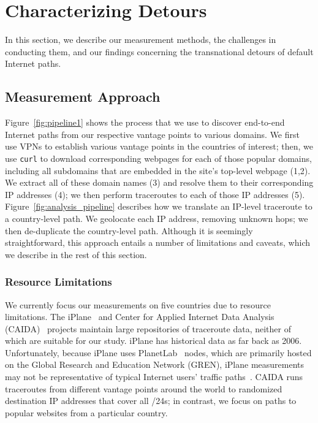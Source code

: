 \section{Characterizing Detours}
\label{datasets}
In this section, we describe our measurement methods, the challenges in
conducting them, and our findings concerning the transnational detours
of default Internet paths.

\subsection{Measurement Approach}
\label{pipeline}

Figure~\ref{fig:pipeline1} shows the process that we use to discover end-to-end
Internet paths from our respective vantage points to various domains. We first use
VPNs
to establish various vantage points in the countries of interest; then, we use 
{\tt curl} to download corresponding webpages for each of those popular domains,
including all subdomains that are embedded in the site's top-level webpage (1,2). We extract
all of these domain names (3) and resolve them to their corresponding IP addresses (4);
we then perform traceroutes to each of those IP addresses (5).
Figure~\ref{fig:analysis_pipeline} describes how we translate an IP-level traceroute
to a country-level path. We geolocate each IP address, removing unknown hops; we
then de-duplicate the country-level path. Although it is seemingly straightforward,
this approach entails a number of limitations and caveats, which we describe in
the
rest of this section.

\subsubsection{Resource Limitations}
\label{resource_limits}

We currently focus our measurements on five countries due to resource limitations.
The iPlane~\cite{madhyastha2006iplane} and Center for Applied Internet Data
Analysis (CAIDA)~\cite{caida} projects maintain large repositories of
traceroute data, neither of which are suitable for our study.   iPlane has
historical data as far back as 2006. Unfortunately, because iPlane uses
PlanetLab~\cite{PlanetLab} nodes, which are primarily hosted on the Global
Research and Education Network (GREN), iPlane measurements may not be
representative of typical Internet users' traffic
paths~\cite{banerjee2004interdomain}.  CAIDA runs traceroutes from different
vantage points around the world to randomized destination IP addresses that
cover all /24s; in contrast, we focus on paths to popular websites from a
particular country.

